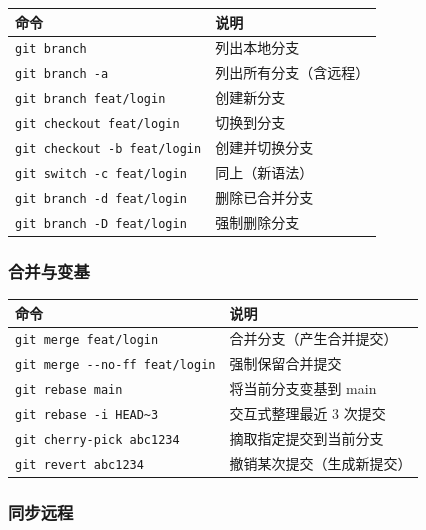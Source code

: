 \begin{center}
\begin{tabular}{ll}
\toprule
命令 & 说明 \\
\midrule
\verb|git branch| & 列出本地分支 \\
\verb|git branch -a| & 列出所有分支（含远程） \\
\verb|git branch feat/login| & 创建新分支 \\
\verb|git checkout feat/login| & 切换到分支 \\
\verb|git checkout -b feat/login| & 创建并切换分支 \\
\verb|git switch -c feat/login| & 同上（新语法） \\
\verb|git branch -d feat/login| & 删除已合并分支 \\
\verb|git branch -D feat/login| & 强制删除分支 \\
\bottomrule
\end{tabular}
\end{center}

\subsubsection{合并与变基}

\begin{center}
\begin{tabular}{ll}
\toprule
命令 & 说明 \\
\midrule
\verb|git merge feat/login| & 合并分支（产生合并提交） \\
\verb|git merge --no-ff feat/login| & 强制保留合并提交 \\
\verb|git rebase main| & 将当前分支变基到 main \\
\verb|git rebase -i HEAD~3| & 交互式整理最近 3 次提交 \\
\verb|git cherry-pick abc1234| & 摘取指定提交到当前分支 \\
\verb|git revert abc1234| & 撤销某次提交（生成新提交） \\
\bottomrule
\end{tabular}
\end{center}

\subsubsection{同步远程}

